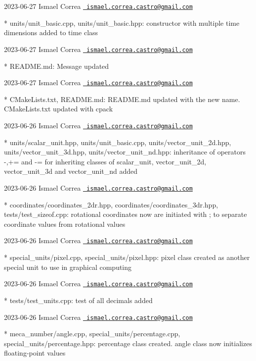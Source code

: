  2023-\/06-\/27 Ismael Correa \href{mailto:ismael.correa.castro@gmail.com}{\texttt{ ismael.\+correa.\+castro@gmail.\+com}} \begin{DoxyVerb}* units/unit_basic.cpp, units/unit_basic.hpp: constructor with
multiple time dimensions added to time class
\end{DoxyVerb}
 2023-\/06-\/27 Ismael Correa \href{mailto:ismael.correa.castro@gmail.com}{\texttt{ ismael.\+correa.\+castro@gmail.\+com}} \begin{DoxyVerb}* README.md: Message updated
\end{DoxyVerb}
 2023-\/06-\/27 Ismael Correa \href{mailto:ismael.correa.castro@gmail.com}{\texttt{ ismael.\+correa.\+castro@gmail.\+com}} \begin{DoxyVerb}* CMakeLists.txt, README.md: README.md updated with the new name.
CMakeLists.txt updated with cpack
\end{DoxyVerb}
 2023-\/06-\/26 Ismael Correa \href{mailto:ismael.correa.castro@gmail.com}{\texttt{ ismael.\+correa.\+castro@gmail.\+com}} \begin{DoxyVerb}* units/scalar_unit.hpp, units/unit_basic.cpp,
units/vector_unit_2d.hpp, units/vector_unit_3d.hpp,
units/vector_unit_nd.hpp: inheritance of operators -,+= and -= for
inheriting classes of scalar_unit, vector_unit_2d, vector_unit_3d
and vector_unit_nd added
\end{DoxyVerb}
 2023-\/06-\/26 Ismael Correa \href{mailto:ismael.correa.castro@gmail.com}{\texttt{ ismael.\+correa.\+castro@gmail.\+com}} \begin{DoxyVerb}* coordinates/coordinates_2dr.hpp, coordinates/coordinates_3dr.hpp,
tests/test_sizeof.cpp: rotational coordinates now are initiated with
; to separate coordinate values from rotational values
\end{DoxyVerb}
 2023-\/06-\/26 Ismael Correa \href{mailto:ismael.correa.castro@gmail.com}{\texttt{ ismael.\+correa.\+castro@gmail.\+com}} \begin{DoxyVerb}* special_units/pixel.cpp, special_units/pixel.hpp: pixel class
created as another special unit to use in graphical computing
\end{DoxyVerb}
 2023-\/06-\/26 Ismael Correa \href{mailto:ismael.correa.castro@gmail.com}{\texttt{ ismael.\+correa.\+castro@gmail.\+com}} \begin{DoxyVerb}* tests/test_units.cpp: test of all decimals added
\end{DoxyVerb}
 2023-\/06-\/26 Ismael Correa \href{mailto:ismael.correa.castro@gmail.com}{\texttt{ ismael.\+correa.\+castro@gmail.\+com}} \begin{DoxyVerb}* meca_number/angle.cpp, special_units/percentage.cpp,
special_units/percentage.hpp: percentage class created. angle class
now initializes floating-point values
\end{DoxyVerb}
